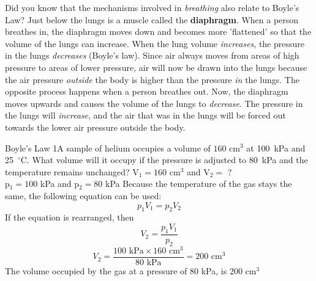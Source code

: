 \begin{IFact}{
Did you know that the mechanisms involved in \textit{breathing} also relate to Boyle's Law? Just below the lungs is a muscle called the \textbf{diaphragm}. When a person breathes in, the diaphragm moves down and becomes more 'flattened' so that the volume of the lungs can increase. When the lung volume \textit{increases}, the pressure in the lungs \textit{decreases} (Boyle's law). Since air always moves from areas of high pressure to areas of lower pressure, air will now be drawn into the lungs because the air pressure \textit{outside} the body is higher than the pressure \textit{in} the lungs. The opposite process happens when a person breathes out. Now, the diaphragm moves upwards and causes the volume of the lungs to \textit{decrease}. The pressure in the lungs will \textit{increase}, and the air that was in the lungs will be forced out towards the lower air pressure outside the body.
}
\end{IFact}
\begin{wex}{Boyle's Law 1}{A sample of helium occupies a volume of $160 \text{ cm}^3$ at 100~kPa and 25~$^\circ$C. What volume will it occupy if the pressure is adjusted to 80~kPa and the temperature remains unchanged?}
{
V$_{1} = 160 \text{ cm}^{3}$ and V$_{2} =$ ?\\
p$_{1} = 100$ kPa and p$_{2} = 80$ kPa
Because the temperature of the gas stays the same, the following equation can be used:
\begin{equation*}
p_{1}V_{1} = p_{2}V_{2}
\end{equation*}
If the equation is rearranged, then
\begin{equation*}
V_{2} = \frac{p_{1}V_{1}}{p_{2}}
\end{equation*}
\begin{equation*}
V_{2} = \frac{100 \text{ kPa} \times 160 \text{ cm}^{3}}{80 \text{ kPa}}
= 200 \text{ cm}^{3}
\end{equation*}
The volume occupied by the gas at a pressure of $80$ kPa, is $200$ cm$^{3}$
}

\end{wex}

